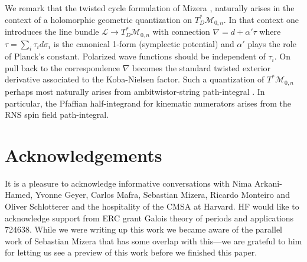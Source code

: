 \documentclass[11pt]{article}
\newcommand{\cL}{\mathcal{L}}
\newcommand{\cM}{\mathcal{M}}
\newcommand{\1}{{\rm 1\hskip-0.25em I}}
\begin{document}
We remark that the twisted cycle formulation of Mizera \cite{Mizera:2019gea}, naturally arises in the context of a holomorphic  geometric quantization on $T^*_D\cM_{0,n}$.  In that context one introduces the line bundle $\cL\rightarrow T^*_D\cM_{0,n}$ with connection $\nabla=d+ \alpha'\tau $  where $\tau=\sum_i \tau_i d\sigma_i$ is the canonical 1-form (symplectic potential) and $\alpha'$ plays the role of Planck's constant. Polarized wave functions should be independent of $\tau_i$.  On pull back to the correspondence $\nabla $ becomes the standard twisted exterior derivative associated to the Koba-Nielsen factor. 
Such a 
quantization of $T^*\cM_{0,n}$ perhaps most naturally arises from ambitwistor-string path-integral \cite{Mason:2013sva}. In particular, the Pfaffian half-integrand for kinematic numerators arises from the RNS spin field path-integral.


\section{Acknowledgements}
It is a pleasure to acknowledge informative conversations with Nima Arkani-Hamed, Yvonne Geyer, Carlos Mafra, Sebastian Mizera, Ricardo Monteiro and Oliver Schlotterer and the hospitality of the CMSA at Harvard. HF would like to acknowledge support from ERC grant Galois theory of periods and applications 724638.  While we were writing up this work we became aware of the parallel work of Sebastian Mizera \cite{Mizera:2019n} that has some overlap with this---we are grateful to him for letting us see a preview of this work before we finished this paper.

  

\end{document}

